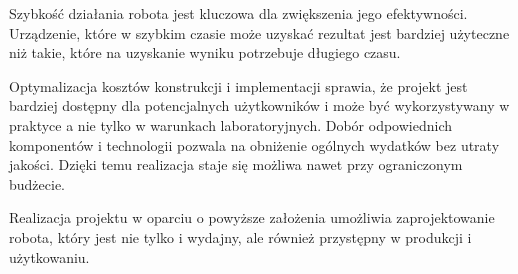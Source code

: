 Szybkość działania robota jest kluczowa dla zwiększenia jego efektywności.
Urządzenie, które w szybkim czasie może uzyskać rezultat jest bardziej użyteczne niż
takie, które na uzyskanie wyniku potrzebuje długiego czasu. 

Optymalizacja kosztów konstrukcji i implementacji sprawia, że projekt jest bardziej dostępny dla potencjalnych użytkowników i może być wykorzystywany w praktyce a nie tylko w warunkach laboratoryjnych. 
Dobór odpowiednich komponentów i technologii pozwala na obniżenie ogólnych wydatków bez utraty jakości.
Dzięki temu realizacja staje się możliwa nawet przy ograniczonym budżecie.

Realizacja projektu w oparciu o powyższe założenia umożliwia zaprojektowanie robota, który jest nie tylko
i wydajny, ale również przystępny w produkcji i użytkowaniu.
